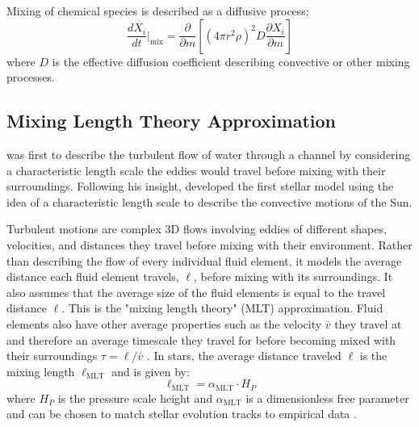 Mixing of chemical species is described as a diffusive process:  
\begin{equation}\label{eq:dX_dm}
\frac{d X_i}{dt}\Big|_{\mathrm{mix}} = \frac{\partial}{\partial m}\left[(4\pi r^2 \rho)^2 D \frac{\partial X_i}{\partial m}\right]
\end{equation}
where $D$ is the effective diffusion coefficient describing convective or other mixing processes.
\subsection{Mixing Length Theory Approximation}

\cite{prandtl7BerichtUber1925} was first to describe the turbulent flow of water through a channel by considering a characteristic length scale the eddies would travel before mixing with their surroundings.
Following his insight, \cite{bohm-vitenseUberWasserstoffkonvektionszoneSternen1958} developed the first stellar model using the idea of a characteristic length scale to describe the convective motions of the Sun.

Turbulent motions are complex 3D flows involving eddies of different shapes, velocities, and distances they travel before mixing with their environment.
Rather than describing the flow of every individual fluid element, it models the average distance each fluid element travels, $\ell$, before mixing with its surroundings.
It also assumes that the average size of the fluid elements is equal to the travel distance $\ell$.
This is the "mixing length theory" (MLT) approximation.
Fluid elements also have other average properties such as the velocity $\bar{v}$ they travel at and therefore an average timescale they travel for before becoming mixed with their surroundings $\tau=\ell/\bar{v}$ \citep{kippenhahnStellarStructureEvolution2013,coxPrinciplesStellarStructure1968,joyceReviewMixingLength2023}.
In stars, the average distance traveled $\ell$ is the mixing length $\ell_{\mathrm{MLT}}$ and is given by:
\begin{equation}
\ell_{\mathrm{MLT}} = \alpha_{\text{MLT}} \cdot H_P
\end{equation}
where $H_P$ is the pressure scale height and $\alpha_{\mathrm{ MLT}}$ is a dimensionless free parameter and can be chosen to match stellar evolution tracks to empirical data \citep{joyceReviewMixingLength2023}.

